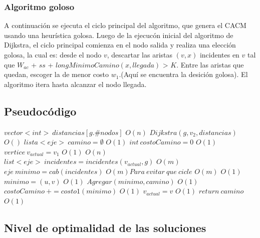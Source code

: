 \subsubsection{Algoritmo goloso}

A continuaci\'on se ejecuta el ciclo principal del algoritmo, que genera el CACM usando una heur\'istica golosa. Luego de la ejecuc\'on inicial del algoritmo de Dijkstra, el ciclo principal comienza en el nodo salida y realiza una elecci\'on golosa, la cual es: desde el nodo $v$, descartar las aristas $(v,x)$ incidentes en $v$ tal que $W_{ac}$ + $ss$ + $longMinimoCamino(x,llegada)$ > $K$. Entre las aristas que quedan, escoger la de menor costo $w_1$.(Aqu\'i se encuentra la desici\'on golosa). El algoritmo itera hasta alcanzar el nodo llegada.

\subsection{Pseudoc\'odigo}

\begin{algorithmic}


\State $vector<int> \: distancias[g.\#nodos]$
\Comment $ O(n) $
\State $ Dijkstra( g, v_2, distancias) $
\Comment $ O() $
\State $lista<eje> \: camino= \emptyset$
\Comment $ O(1) $
\State $ int \: costoCamino = 0 $
\Comment $ O(1) $
\State $ vertice \: v_{actual} = v_1 $
\Comment $ O(1) $
\Comment $ O(n) $
	\State $ list<eje> \: incidentes = incidentes(v_{actual}, g) $
	\Comment $ O(m) $
	\State $ eje \:	 minimo = cab(incidentes) $
	\Comment $ O(m) Para\: evitar \:que \:cicle $
	\Comment $ O(m) $
		\Comment $ O(1) $
			\State $ minimo = (u,v) $
			\Comment $ O(1) $
		\EndIf
	\EndFor
	\State $ Agregar(minimo, camino) $
	\Comment $ O(1) $
	\State $ costoCamino \: += costo1(minimo) $
	\Comment $ O(1) $
	\State $ v_{actual} = v $
	\Comment $ O(1) $
\EndWhile
\State $ return \: camino $
\Comment $ O(1) $

\EndProcedure

\end{algorithmic}


\subsection{Nivel de optimalidad de las soluciones}

